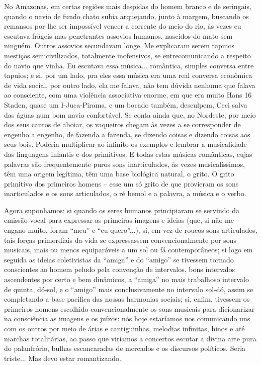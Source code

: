 No Amazonas, em certas regiões mais despidas do homem branco e de
seringais, quando o navio de fundo chato subia arquejando, junto à
margem, buscando os remansos por lhe ser impossível vencer a corrente do
meio do rio, às vezes eu escutava frágeis mas penetrantes assovios
humanos, nascidos do mato sem ninguém. Outros assovios secundavam longe.
Me explicaram serem tapuios mestiços semicivilizados, totalmente
inofensivos, se entrecomunicando a respeito do navio que vinha. Eu
escutava essa música... romântica, simples conversa entre tapuios; e si,
por um lado, pra eles essa música era uma real conversa econômica de
vida social, por outro lado, ela me falava, não tem dúvida nenhuma que
falava ao consciente, com uma violência associativa enorme, em que era
muito Hans 16 Staden, quase um I-Juca-Pirama, e um bocado também,
desculpem, Ceci salva das águas num bom navio confortável. Se conta
ainda que, no Nordeste, por meio dos seus cantos de aboiar, os vaqueiros
chegam às vezes a se corresponder de engenho a engenho, de fazenda a
fazenda, se dizendo coisas e dizendo coisas aos seus bois. Poderia
multiplicar ao infinito os exemplos e lembrar a musicalidade das
linguagens infantis e dos primitivos. E todas estas músicas românticas,
cujas palavras são frequentemente puros sons inarticulados, às vezes
musicalíssimos, têm uma origem legítima, têm uma base biológica natural,
o grito. O grito primitivo dos primeiros homens -- esse um só grito de
que provieram os sons inarticulados e os sons articulados, o ré bemol e
a palavra, a música e o verbo.

Agora suponhamos: si quando os seres humanos principiaram se servindo da
emissão vocal para expressar as primeiras imagens e ideias (que, si não
me engano muito, foram ``meu'' e ``eu quero''...), si, em vez de roucos
sons articulados, tais forças primordiais da vida se expressassem
convencionalmente por sons musicais, mais ou menos equiparáveis a um sol
ou fá contemporâneos; si logo em seguida as ideias coletivistas da
``amiga'' e do ``amigo'' se tivessem tornado conscientes ao homem peludo
pela convenção de intervalos, bons intervalos ascendentes por certo e
bem dinâmicos, a ``amiga'' no mais trabalhoso intervalo de quinta,
dó-sol, e o ``amigo'' mais conclusivamente no intervalo sol-dó, assim se
completando a base pacífica das nossas harmonias sociais; si, enfim,
tivessem os primeiros homens escolhido convencionalmente os sons
musicais para dicionarizar na consciência as imagens e os juízos: nós
hoje estaríamos nos comunicando uns com os outros por meio de árias e
cantiguinhas, melodias infinitas, hinos e até marchas totalitárias, ao
passo que viríamos a concertos escutar a divina arte pura do
palanfrório, bulhas escancaradas de mercados e os discursos políticos.
Seria triste... Mas devo estar romantizando.

